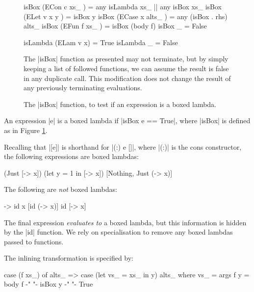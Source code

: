 \begin{figure}
\begin{code}
isBox (ECon c xs_     )  =  any isLambda xs_ ||  any isBox xs_
isBox (ELet v x y     )  =  isBox y
isBox (ECase x alts_  )  =  any (isBox . rhs) alts_
isBox (EFun f xs_     )  =  isBox (body f)
isBox _                  =  False

isLambda (ELam v x)  = True
isLambda _           = False
\end{code}

The |isBox| function as presented may not terminate, but by simply keeping a list of followed functions, we can assume the result is false in any duplicate call. This modification does not change the result of any previously terminating evaluations.
\caption{The |isBox| function, to test if an expression is a boxed lambda.}
\label{figF:boxed_lambda}
\end{figure}

\begin{definition}
An expression |e| is a boxed lambda if |isBox e == True|, where |isBox| is defined as in Figure \ref{figF:boxed_lambda}.
\end{definition}

\begin{example}
Recalling that |[e]| is shorthand for |(:) e []|, where |(:)| is the cons constructor, the following expressions are boxed lambdas:

\ignore\begin{code}
[\x -> x]
(Just [\x -> x])
(let y = 1 in [\x -> x])
[Nothing, Just (\x -> x)]
\end{code}

\noindent The following are \textit{not} boxed lambdas:

\ignore\begin{code}
\x -> id x
[id (\x -> x)]
id [\x -> x]
\end{code}

The final expression \textit{evaluates to} a boxed lambda, but this information is hidden by the |id| function. We rely on specialisation to remove any boxed lambdas passed to functions.
\end{example}

\begin{definition}
The inlining transformation is specified by:

\ignore\begin{code}
case (f xs_) of alts_
    => case (let vs_ = xs_ in y) alts_
    where
        vs_ = args f
        y = body f
        {-"  "-} isBox y {-"  "-} True
\end{code}
\end{definition}

